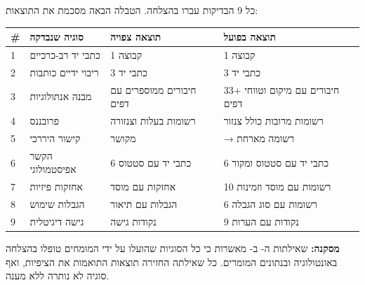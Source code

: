 \documentclass[12pt,a4paper]{article}
\newcommand{\en}[1]{\textenglish{\LR{#1}}}
\begin{document}
כל 9 הבדיקות עברו בהצלחה. הטבלה הבאה מסכמת את התוצאות:

\begin{longtable}{|p{0.5cm}|p{4cm}|p{3cm}|p{4cm}|}
\hline
\textbf{\#} & \textbf{סוגיה שנבדקה} & \textbf{תוצאה צפויה} & \textbf{תוצאה בפועל} \\
\hline
\endhead

1 & כתבי יד רב-כרכיים & 1 קבוצה & 1 קבוצה \\
\hline
2 & ריבוי ידיים כותבות & 3 כתבי יד & 3 כתבי יד \\
\hline
3 & מבנה אנתולוגיות & חיבורים ממוספרים עם דפים & 33+ חיבורים עם מיקום וטווחי דפים \\
\hline
4 & פרובננס & רשומות בעלות וצנזורה & רשומות מרובות כולל צנזור \\
\hline
5 & קישור היררכי & \en{Jerusalem 8210} מקושר & \en{Jerusalem 8210} → רשומה מארחת \\
\hline
6 & הקשר אפיסטמולוגי & 6 כתבי יד עם סטטוס & 6 כתבי יד עם סטטוס ומקור \\
\hline
7 & אחזקות פיזיות & אחזקות עם מוסד & 10 רשומות עם מוסד וזמינות \\
\hline
8 & הגבלות שימוש & הגבלות עם תיאור & 6 רשומות עם סוג הגבלה \\
\hline
9 & גישה דיגיטלית & נקודות גישה & 9 נקודות עם הערות \\
\hline

\end{longtable}

\textbf{מסקנה:} שאילתות ה-\en{SPARQL} ב-\en{Protégé} מאשרות כי כל הסוגיות שהועלו על ידי המומחים טופלו בהצלחה באונטולוגיה ובנתונים המומרים. כל שאילתה החזירה תוצאות התואמות את הציפיות, ואף סוגיה לא נותרה ללא מענה.
\end{document}
